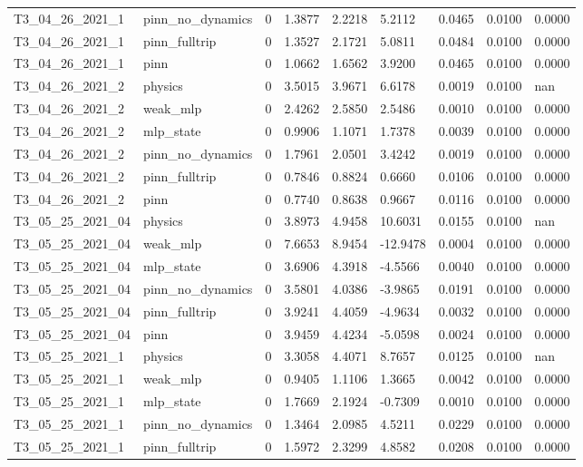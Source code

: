 \begin{table}[t]
\begin{tabular}{lllllllll}
T3\_04\_26\_2021\_1 & pinn\_no\_dynamics & 0 & 1.3877 & 2.2218 & 5.2112 & 0.0465 & 0.0100 & 0.0000 \\
T3\_04\_26\_2021\_1 & pinn\_fulltrip & 0 & 1.3527 & 2.1721 & 5.0811 & 0.0484 & 0.0100 & 0.0000 \\
T3\_04\_26\_2021\_1 & pinn & 0 & 1.0662 & 1.6562 & 3.9200 & 0.0465 & 0.0100 & 0.0000 \\
T3\_04\_26\_2021\_2 & physics & 0 & 3.5015 & 3.9671 & 6.6178 & 0.0019 & 0.0100 & nan \\
T3\_04\_26\_2021\_2 & weak\_mlp & 0 & 2.4262 & 2.5850 & 2.5486 & 0.0010 & 0.0100 & 0.0000 \\
T3\_04\_26\_2021\_2 & mlp\_state & 0 & 0.9906 & 1.1071 & 1.7378 & 0.0039 & 0.0100 & 0.0000 \\
T3\_04\_26\_2021\_2 & pinn\_no\_dynamics & 0 & 1.7961 & 2.0501 & 3.4242 & 0.0019 & 0.0100 & 0.0000 \\
T3\_04\_26\_2021\_2 & pinn\_fulltrip & 0 & 0.7846 & 0.8824 & 0.6660 & 0.0106 & 0.0100 & 0.0000 \\
T3\_04\_26\_2021\_2 & pinn & 0 & 0.7740 & 0.8638 & 0.9667 & 0.0116 & 0.0100 & 0.0000 \\
T3\_05\_25\_2021\_04 & physics & 0 & 3.8973 & 4.9458 & 10.6031 & 0.0155 & 0.0100 & nan \\
T3\_05\_25\_2021\_04 & weak\_mlp & 0 & 7.6653 & 8.9454 & -12.9478 & 0.0004 & 0.0100 & 0.0000 \\
T3\_05\_25\_2021\_04 & mlp\_state & 0 & 3.6906 & 4.3918 & -4.5566 & 0.0040 & 0.0100 & 0.0000 \\
T3\_05\_25\_2021\_04 & pinn\_no\_dynamics & 0 & 3.5801 & 4.0386 & -3.9865 & 0.0191 & 0.0100 & 0.0000 \\
T3\_05\_25\_2021\_04 & pinn\_fulltrip & 0 & 3.9241 & 4.4059 & -4.9634 & 0.0032 & 0.0100 & 0.0000 \\
T3\_05\_25\_2021\_04 & pinn & 0 & 3.9459 & 4.4234 & -5.0598 & 0.0024 & 0.0100 & 0.0000 \\
T3\_05\_25\_2021\_1 & physics & 0 & 3.3058 & 4.4071 & 8.7657 & 0.0125 & 0.0100 & nan \\
T3\_05\_25\_2021\_1 & weak\_mlp & 0 & 0.9405 & 1.1106 & 1.3665 & 0.0042 & 0.0100 & 0.0000 \\
T3\_05\_25\_2021\_1 & mlp\_state & 0 & 1.7669 & 2.1924 & -0.7309 & 0.0010 & 0.0100 & 0.0000 \\
T3\_05\_25\_2021\_1 & pinn\_no\_dynamics & 0 & 1.3464 & 2.0985 & 4.5211 & 0.0229 & 0.0100 & 0.0000 \\
T3\_05\_25\_2021\_1 & pinn\_fulltrip & 0 & 1.5972 & 2.3299 & 4.8582 & 0.0208 & 0.0100 & 0.0000 \\

\end{tabular}
\end{table}
